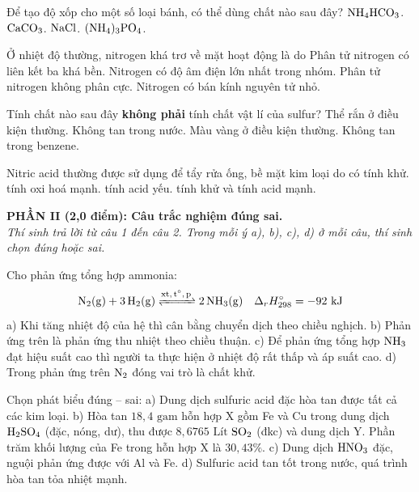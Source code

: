 \documentclass[12pt,a4paper]{article}
\begin{document}
\begin{ex}
Để tạo độ xốp cho một số loại bánh, có thể dùng chất nào sau đây?
\choice
{$\ce{NH4HCO3}$.}
{$\ce{CaCO3}$.}
{$\ce{NaCl}$.}
{$\ce{(NH4)3PO4}$.}
\loigiai{}
\end{ex}

\begin{ex}
Ở nhiệt độ thường, nitrogen khá trơ về mặt hoạt động là do
\choice
{Phân tử nitrogen có liên kết ba khá bền.}
{Nitrogen có độ âm điện lớn nhất trong nhóm.}
{Phân tử nitrogen không phân cực.}
{Nitrogen có bán kính nguyên tử nhỏ.}
\loigiai{}
\end{ex}

\begin{ex}
Tính chất nào sau đây \textbf{không phải} tính chất vật lí của sulfur?
\choice
{Thể rắn ở điều kiện thường.}
{Không tan trong nước.}
{Màu vàng ở điều kiện thường.}
{Không tan trong benzene.}
\loigiai{}
\end{ex}

\begin{ex}
Nitric acid thường được sử dụng để tẩy rửa ống, bề mặt kim loại do có
\choice
{tính khử.}
{tính oxi hoá mạnh.}
{tính acid yếu.}
{tính khử và tính acid mạnh.}
\loigiai{}
\end{ex}


\bigskip
\noindent
\textbf{PHẦN II (2,0 điểm): Câu trắc nghiệm đúng sai.}\\
\textit{Thí sinh trả lời từ câu 1 đến câu 2. Trong mỗi ý a), b), c), d) ở mỗi câu, thí sinh chọn đúng hoặc sai.}

\begin{ex}
Cho phản ứng tổng hợp ammonia:
\[ \ce{N2(g) + 3H2(g) <=>[xt, t^\circ, p] 2NH3(g)} \quad \Delta_r H_{298}^\circ = -92\text{ kJ} \]
\choiceTF
{a) Khi tăng nhiệt độ của hệ thì cân bằng chuyển dịch theo chiều nghịch.}
{b) Phản ứng trên là phản ứng thu nhiệt theo chiều thuận.}
{c) Để phản ứng tổng hợp $\ce{NH3}$ đạt hiệu suất cao thì người ta thực hiện ở nhiệt độ rất thấp và áp suất cao.}
{d) Trong phản ứng trên $\ce{N2}$ đóng vai trò là chất khử.}
\loigiai{}
\end{ex}

\begin{ex}
Chọn phát biểu đúng -- sai:
\choiceTF
{a) Dung dịch sulfuric acid đặc hòa tan được tất cả các kim loại.}
{b) Hòa tan $18{,}4\text{ gam}$ hỗn hợp X gồm Fe và Cu trong dung dịch $\ce{H2SO4}$ (đặc, nóng, dư), thu được $8{,}6765\text{ Lít}$ $\ce{SO2}$ (đkc) và dung dịch Y. Phần trăm khối lượng của Fe trong hỗn hợp X là $30{,}43\%$.}
{c) Dung dịch $\ce{HNO3}$ đặc, nguội phản ứng được với Al và Fe.}
{d) Sulfuric acid tan tốt trong nước, quá trình hòa tan tỏa nhiệt mạnh.}
\loigiai{}
\end{ex}
\end{document}
